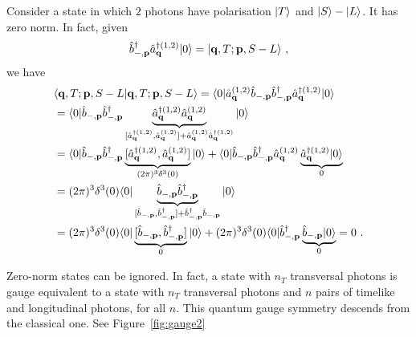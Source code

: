     \begin{example}
        Consider a state in which $2$ photons have polarisation $\vert T\rangle$ and $\vert S\rangle - \vert L\rangle$. It has zero norm. In fact, given
        \begin{equation*}
            \hat b_{-, \mathbf p}^\dagger \hat a_{\mathbf q}^{\dagger (1,2)} \vert0\rangle = \vert\mathbf q, T; \mathbf p, S-L\rangle ~,
        \end{equation*}
        we have 
        \begin{equation*}
        \begin{aligned}
            & \langle\mathbf q, T; \mathbf p, S-L\vert\mathbf q, T; \mathbf p, S-L\rangle = \langle0\vert \hat a_{\mathbf q}^{(1,2)} \hat b_{-, \mathbf p} \hat b_{-, \mathbf p}^\dagger \hat a_{\mathbf q}^{\dagger (1,2)} \vert0\rangle \\ & = \langle0\vert \hat b_{-, \mathbf p} \hat b_{-, \mathbf p}^\dagger \underbrace{\hat a_{\mathbf q}^{\dagger (1,2)} \hat a_{\mathbf q}^{(1,2)}}_{[\hat a_{\mathbf q}^{\dagger (1,2)} , \hat a_{\mathbf q}^{(1,2)}] + \hat a_{\mathbf q}^{(1,2)} \hat a_{\mathbf q}^{\dagger (1,2)}} \vert0\rangle \\ & = \langle0\vert \hat b_{-, \mathbf p} \hat b_{-, \mathbf p}^\dagger \underbrace{[\hat a_{\mathbf q}^{\dagger (1,2)} , \hat a_{\mathbf q}^{(1,2)}] }_{(2\pi)^3 \delta^3 (0) } \vert0\rangle + \langle0\vert \hat b_{-, \mathbf p} \hat b_{-, \mathbf p}^\dagger \hat a_{\mathbf q}^{(1,2)} \underbrace{\hat a_{\mathbf q}^{\dagger (1,2)} \vert0\rangle}_0 \\ & = (2\pi)^3 \delta^3 (0) \langle0\vert \underbrace{\hat b_{-, \mathbf p} \hat b_{-, \mathbf p}^\dagger}_{[\hat b_{-, \mathbf p} , \hat b_{-, \mathbf p}^\dagger] + \hat b_{-, \mathbf p}^\dagger \hat b_{-, \mathbf p}} \vert0\rangle \\ & = (2\pi)^3 \delta^3 (0) \langle0\vert \underbrace{[\hat b_{-, \mathbf p} , \hat b_{-, \mathbf p}^\dagger]}_0 \vert0\rangle + (2\pi)^3 \delta^3 (0) \langle0\vert \hat b_{-, \mathbf p}^\dagger \underbrace{\hat b_{-, \mathbf p} \vert0\rangle}_0 = 0 ~.
        \end{aligned}
        \end{equation*}
    \end{example}

    Zero-norm states can be ignored. In fact, a state with $n_T$ transversal photons is gauge equivalent to a state with $n_T$ transversal photons and $n$ pairs of timelike and longitudinal photons, for all $n$. This quantum gauge symmetry descends from the classical one. See Figure~\eqref{fig:gauge2}
    
